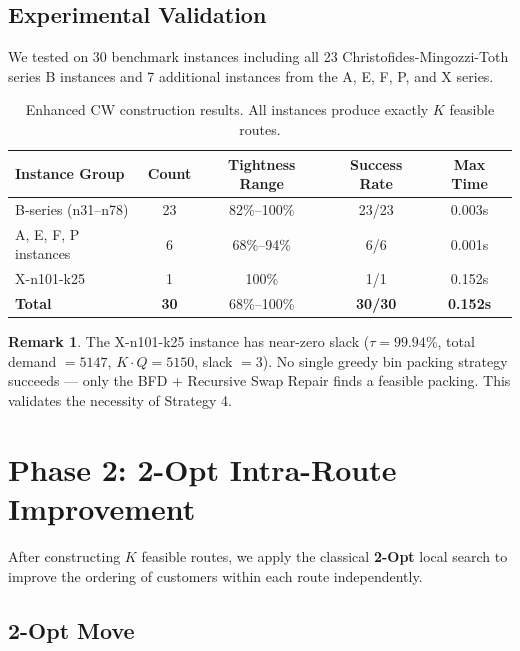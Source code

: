 \documentclass[12pt,a4paper]{article}
\theoremstyle{definition}
\newtheorem{remark}{Remark}[section]
\begin{document}
\subsection{Experimental Validation}

We tested on 30 benchmark instances including all 23 Christofides-Mingozzi-Toth series B instances and 7 additional instances from the A, E, F, P, and X series.

\begin{table}[H]
\centering
\begin{tabular}{lcccc}
\toprule
\textbf{Instance Group} & \textbf{Count} & \textbf{Tightness Range} & \textbf{Success Rate} & \textbf{Max Time} \\
\midrule
B-series (n31--n78) & 23 & 82\%--100\% & 23/23 & 0.003s \\
A, E, F, P instances & 6 & 68\%--94\% & 6/6 & 0.001s \\
X-n101-k25 & 1 & 100\% & 1/1 & 0.152s \\
\midrule
\textbf{Total} & \textbf{30} & 68\%--100\% & \textbf{30/30} & \textbf{0.152s} \\
\bottomrule
\end{tabular}
\caption{Enhanced CW construction results. All instances produce exactly $K$ feasible routes.}
\end{table}

\begin{remark}
The X-n101-k25 instance has near-zero slack ($\tau = 99.94\%$, total demand $= 5147$, $K \cdot Q = 5150$, slack $= 3$). No single greedy bin packing strategy succeeds --- only the BFD + Recursive Swap Repair finds a feasible packing. This validates the necessity of Strategy 4.
\end{remark}

\section{Phase 2: 2-Opt Intra-Route Improvement}

After constructing $K$ feasible routes, we apply the classical \textbf{2-Opt} local search to improve the ordering of customers within each route independently.

\subsection{2-Opt Move}
\end{document}
